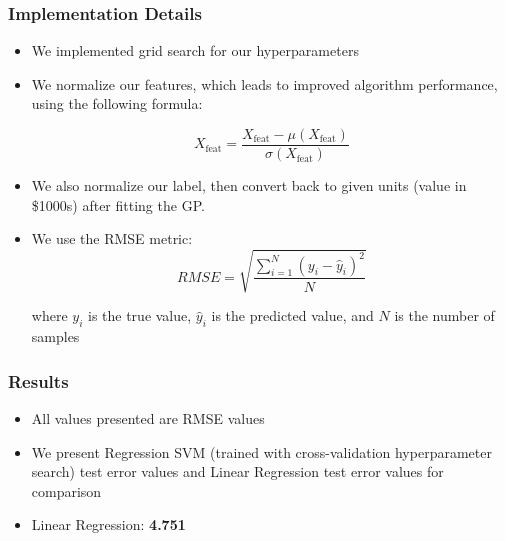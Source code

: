 \documentclass[pdf]{beamer}
\begin{document}
\begin{frame}
  \frametitle{Implementation Details}

  \begin{itemize}
    \item We implemented grid search for our hyperparameters
    \item We normalize our features, which leads to improved algorithm performance, using the following
      formula:

      \[
        X_{\text{feat}} = \frac{X_{\text{feat}} - \mu(X_{\text{feat}})}{\sigma(X_{\text{feat}})}
      \]
    \item We also normalize our label, then convert back to given units (value in \$1000s) after fitting the GP.
    \item We use the RMSE metric:
      \[
        RMSE = \sqrt{\frac{\sum\limits_{i=1}^{N} (y_i - \hat y_i)^{2}}{N}}
      \]

      where $y_i$ is the true value, $\hat y_i$ is the predicted value, and $N$ is the number of samples

  \end{itemize}
\end{frame}

\begin{frame}
  \frametitle{Results}

  \begin{itemize}
    \item All values presented are RMSE values
    \item We present Regression SVM (trained with cross-validation hyperparameter search) test error values and Linear
      Regression test error values for comparison
    \item Linear Regression: \textbf{4.751}
  \end{itemize}

  \begin{table}
    \centering
    \caption{Table of Boston Housing Dataset feature names and features}
  \end{table}
\end{frame}
\end{document}
